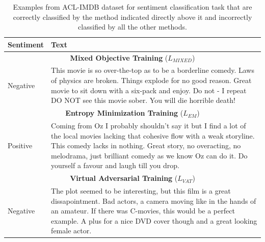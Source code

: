 \documentclass[letterpaper]{article}
\begin{document}
\begin{table}[t]
\begin{minipage}{\linewidth}
\small
\centering
\begin{tabularx}{\linewidth}{@{} l X @{}}
\toprule
\textbf{Sentiment} & \textbf{Text} \\
\midrule
\multicolumn{2}{c}{\textbf{Mixed Objective Training} ($L_{\textit{MIXED}}$)} \\
\midrule
Negative & This movie is so over-the-top as to be a borderline comedy. Laws of physics are broken. Things explode for no good reason. Great movie to sit down with a six-pack and enjoy. Do not - I repeat DO NOT see this movie sober. You will die horrible death!\\
\midrule
\multicolumn{2}{c}{\textbf{Entropy Minimization Training} ($L_{\textit{EM}}$)} \\
\midrule
Positive & Coming from Oz I probably shouldn't say it but I find a lot of the local movies lacking that cohesive flow with a weak storyline. This comedy lacks in nothing. Great story, no overacting, no melodrama, just brilliant comedy as we know Oz can do it. Do yourself a favour and laugh till you drop.\\
\midrule
\multicolumn{2}{c}{\textbf{Virtual Adversarial Training} ($L_{\textit{VAT}}$)} \\
\midrule
Negative & The plot seemed to be interesting, but this film is a great dissapointment. Bad actors, a camera moving like in the hands of an amateur. If there was C-movies, this would be a perfect example. A plus for a nice DVD cover though and a great looking female actor.\\
\bottomrule
\end{tabularx}
\caption{Examples from ACL-IMDB dataset for sentiment classification task that are correctly classified by the method indicated directly above it and incorrectly classified by all the other methods.}
\label{table:examples}
\end{minipage}
\end{table}
\end{document}
